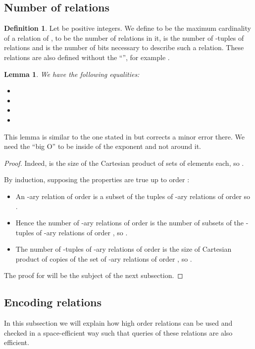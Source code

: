 \documentclass[a4paper,12pt]{article}
\newtheorem{lemma}[theorem]{Lemma}
\theoremstyle{definition}
\newtheorem{definition}[theorem]{Definition}
\begin{document}
\subsection{Number of relations}
\begin{definition}Let  be positive integers. We define 
  to be the maximum cardinality of a relation of , 
  to be the number of relations in it,  is the number of
  -tuples of relations and  is the number of bits necessary to
  describe such a relation. These relations are also defined
  without the ``'', for example .\end{definition}
\begin{lemma}
  We have the following equalities:
  \label{size}
  \begin{itemize}
  \item 
  \item
  \item 
  \item 
  \end{itemize}
\end{lemma}
This lemma is similar to the one stated in \cite{lauri} but corrects a
minor error there. We need the ``big O'' to be inside of the exponent
and not around it. 
\begin{proof}Indeed,  is the size of the Cartesian product of  sets
  of  elements each, so
  .

  By induction, supposing the properties are true up to order
  :
  \begin{itemize}
  \item{}An -ary relation of order  is a subset of the tuples of
    -ary relations of order  so
    .
  \item{}Hence the number of -ary relations of order  is the
    number of subsets of the -tuples of -ary relations of order
    , so
    .
  \item The number of -tuples of -ary relations of order  is
    the size of Cartesian product of  copies of the set of -ary
    relations of order , so
    .
\end{itemize}
The proof for  will be the subject of the next subsection.
\end{proof}
\subsection{Encoding relations}\label{code}
In this subsection we will explain how high order relations can be
used and checked in a space-efficient way such that queries of these
relations are also efficient.
\end{document}
